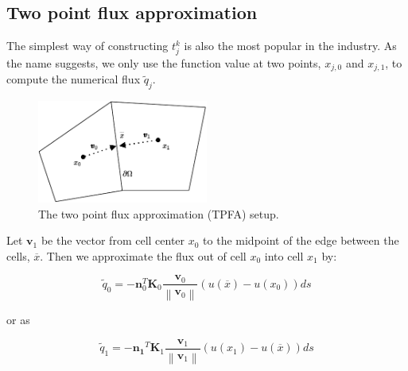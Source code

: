 \documentclass[../Main/main.tex]{subfiles}
\begin{document}
	\subsection*{Two point flux approximation}
	The simplest way of constructing $t_{j}^k$ is also the most popular in the industry. As the name suggests, we only use the function value at two points, $x_{j,0}$ and $x_{j,1}$, to compute the numerical flux $\tilde{q}_j$.
	\begin{figure}[H]
		\centering
		\includegraphics[width=0.5\textwidth]{two point.pdf}
		\caption{The two point flux approximation (TPFA) setup.}
		\label{fig:tpfa control volume}
	\end{figure}
	Let $\bm{v}_1$ be the vector from cell center $x_0$ to the midpoint of the edge between the cells, $\overline{x}$. Then we approximate the flux out of cell $x_0$ into cell $x_1$ by:
	
	\begin{equation}\label{eq:f_0}
		\tilde{q}_0=-\bm{n}_0^T \bm{K}_0  \frac{\bm{v}_0}{\left \| \bm{v}_0 \right \|} (u(\overline{x})-u(x_0))ds
	\end{equation}
	
	or as
	
	\begin{equation}\label{eq:f_1}
		\tilde{q}_1 = -\bm{n_1}^T \bm{K}_1  \frac{\bm{v}_1}{\left \| \bm{v}_1 \right \|} (u(x_1)-u(\overline{x}))ds
	\end{equation}	
	
\end{document}
